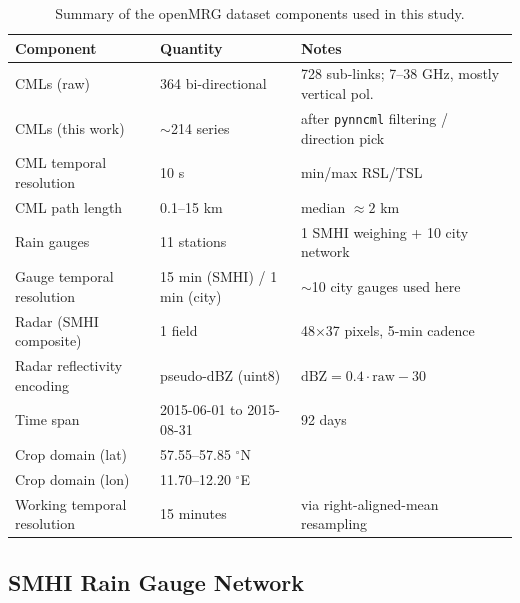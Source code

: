\documentclass[12pt, a4paper]{article}
\begin{document}
\begin{table}[h]
\centering
\caption{Summary of the openMRG dataset components used in this study.}
\label{tab:openmrg_summary}
\begin{tabular}{lll}
\toprule
Component & Quantity & Notes \\
\midrule
CMLs (raw)                  & 364 bi-directional             & 728 sub-links; 7--38 GHz, mostly vertical pol. \\
CMLs (this work)            & \(\sim\)214 series             & after \texttt{pynncml} filtering / direction pick \\
CML temporal resolution     & 10 s                            & min/max RSL/TSL \\
CML path length             & 0.1--15 km                      & median \(\approx 2\) km \\
Rain gauges                 & 11 stations                    & 1 SMHI weighing + 10 city network \\
Gauge temporal resolution   & 15 min (SMHI) / 1 min (city)   & \(\sim\)10 city gauges used here \\
Radar (SMHI composite)      & 1 field                        & 48\(\times\)37 pixels, 5-min cadence \\
Radar reflectivity encoding & pseudo-dBZ (uint8)             & \(\mathrm{dBZ} = 0.4\!\cdot\!\text{raw} - 30\) \\
Time span                   & 2015-06-01 to 2015-08-31       & 92 days \\
Crop domain (lat)           & 57.55--57.85 \(^\circ\)N       & \\
Crop domain (lon)           & 11.70--12.20 \(^\circ\)E       & \\
Working temporal resolution & 15 minutes                     & via right-aligned-mean resampling \\
\bottomrule
\end{tabular}
\end{table}

\subsection{SMHI Rain Gauge Network}\label{sec:gauges}
\end{document}
